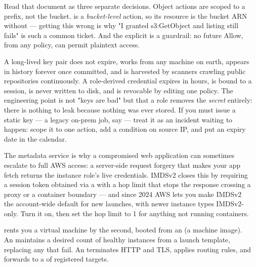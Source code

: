 Read that document as three separate decisions. Object actions are scoped to a prefix, not the bucket.  is a \emph{bucket-level} action, so its resource is the bucket ARN without \code{/*} --- getting this wrong is why "I granted s3:GetObject and listing still fails" is such a common ticket. And the explicit  is a guardrail: no future Allow, from any policy, can permit plaintext access.

\begin{secwarn}
A long-lived key pair does not expire, works from any machine on earth, appears in  history forever once committed, and is harvested by scanners crawling public repositories continuously. A role-derived credential expires in hours, is bound to a session, is never written to disk, and is revocable by editing one policy. The engineering point is not "keys are bad" but that a role removes the \emph{secret} entirely: there is nothing to leak because nothing was ever stored. If you must issue a static key --- a legacy on-prem job, say --- treat it as an incident waiting to happen: scope it to one action, add a condition on source IP, and put an expiry date in the calendar.
\end{secwarn}

\begin{behind}
The metadata service is why a compromised web application can sometimes escalate to full AWS access: a server-side request forgery that makes your app fetch  returns the instance role's live credentials. IMDSv2 closes this by requiring a session token obtained via a  with a hop limit that stops the response crossing a proxy or a container boundary --- and since 2024 AWS lets you make IMDSv2 the account-wide default for new launches, with newer instance types IMDSv2-only. Turn it on, then set the hop limit to 1 for anything not running containers.
\end{behind}


  rents you a virtual machine by the second, booted from an  (a machine image). An  maintains a desired count of healthy instances from a launch template, replacing any that fail. An  terminates HTTP and TLS, applies routing rules, and forwards to a  of registered targets.


